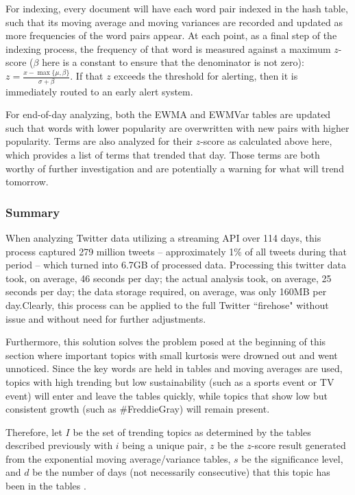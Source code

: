 \documentclass[preprint,review,12pt]{elsarticle}
\begin{document}
For indexing, every document will have each word pair indexed in the hash table, such that its moving average and moving variances are recorded and updated as more frequencies of the word pairs appear. At each point, as a final step of the indexing process, the frequency of that word is measured against a maximum $z$-score ($\beta$ here is a constant to ensure that the denominator is not zero): $z = \frac{x-\max\{\mu, \beta\}}{\sigma + \beta}$. If that $z$ exceeds the threshold for alerting, then it is immediately routed to an early alert system.

For end-of-day analyzing, both the EWMA and EWMVar tables are updated such that words with lower popularity are overwritten with new pairs with higher popularity. Terms are also analyzed for their $z$-score as calculated above here, which provides a list of terms that trended that day. Those terms are both worthy of further investigation and are potentially a warning for what will trend tomorrow.

\subsubsection{Summary}
\label{what is being shared summary}
When analyzing Twitter data utilizing a streaming API over 114 days, this process captured 279 million tweets -- approximately 1\% of all tweets during that period -- which turned into 6.7GB of processed data. Processing this twitter data took, on average, 46 seconds per day; the actual analysis took, on average, 25 seconds per day; the data storage required, on average, was only 160MB per day.Clearly, this process can be applied to the full Twitter ``firehose" without issue and without need for further adjustments.

Furthermore, this solution solves the problem posed at the beginning of this section where important topics with small kurtosis were drowned out and went unnoticed. Since the key words are held in tables and moving averages are used, topics with high trending but low sustainability (such as a sports event or TV event) will enter and leave the tables quickly, while topics that show low but consistent growth (such as \#FreddieGray) will remain present. 

Therefore, let $I$ be the set of trending topics as determined by the tables described previously with $i$ being a unique pair, $z$ be the $z$-score result generated from the exponential moving average/variance tables, $s$ be the significance level, and $d$ be the number of days (not necessarily consecutive) that this topic has been in the tables .
\end{document}
